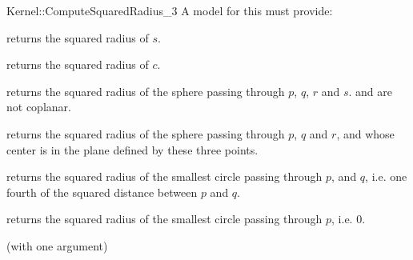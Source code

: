 \begin{ccRefFunctionObjectConcept}{Kernel::ComputeSquaredRadius_3}
A model for this must provide:


       {returns the squared radius of $s$. }

       {returns the squared radius of $c$. }

       {returns the squared radius of the sphere passing through $p$, $q$, $r$
       and $s$. \ccPrecond {} and  are not coplanar.}

       {returns the squared radius of the sphere passing through $p$, $q$ and
       $r$, and whose center is in the plane defined by these three points.}

{returns the squared radius of the smallest circle passing through $p$,
and $q$, i.e. one fourth of the squared distance between $p$ and $q$.}

{returns the squared radius of the smallest circle passing through $p$, i.e. $0$.}

\ccRefines
{} (with one argument)

\ccSeeAlso
{}\\
\\
 \\

\end{ccRefFunctionObjectConcept}
